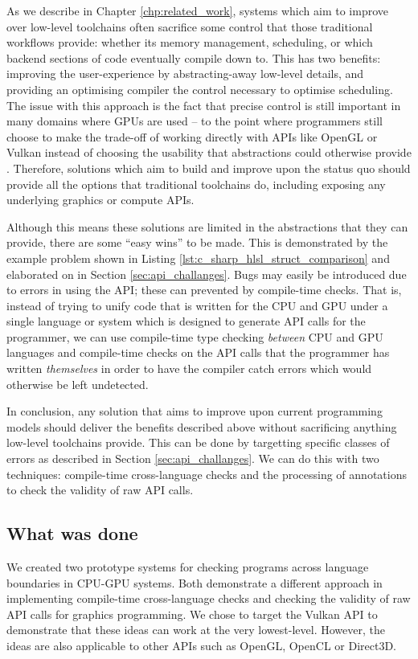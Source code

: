 \documentclass[a4paper,12pt,twoside,openright]{report}
\begin{document}
As we describe in Chapter \ref{chp:related_work}, systems which aim to improve
over low-level toolchains often sacrifice some control that those traditional
workflows provide: whether its memory management, scheduling, or which backend
sections of code eventually compile down to. This has two benefits: improving
the user-experience by abstracting-away low-level details, and providing an
optimising compiler the control necessary to optimise scheduling. The issue
with this approach is the fact that precise control is still important in many
domains where GPUs are used -- to the point where programmers still choose to
make the trade-off of working directly with APIs like OpenGL or Vulkan instead
of choosing the usability that abstractions could otherwise provide
\cite{TODO}. Therefore, solutions which aim to build and improve upon the
status quo should provide all the options that traditional toolchains do,
including exposing any underlying graphics or compute APIs.

Although this means these solutions are limited in the abstractions that they
can provide, there are some ``easy wins'' to be made. This is demonstrated by
the example problem shown in Listing \ref{lst:c_sharp_hlsl_struct_comparison}
and elaborated on in Section \ref{sec:api_challanges}. Bugs may easily be
introduced due to errors in using the API; these can prevented by compile-time
checks. That is, instead of trying to unify code that is written for the CPU
and GPU under a single language or system which is designed to generate API
calls for the programmer, we can use compile-time type checking
\textit{between} CPU and GPU languages and compile-time checks on the API calls
that the programmer has written \textit{themselves} in order to have the
compiler catch errors which would otherwise be left undetected.

In conclusion, any solution that aims to improve upon current programming
models should deliver the benefits described above without sacrificing anything
low-level toolchains provide. This can be done by targetting specific classes of
errors as described in Section \ref{sec:api_challanges}. We can do this with
two techniques: compile-time cross-language checks and the processing of
annotations to check the validity of raw API calls.

\subsection{What was done}

We created two prototype systems for checking programs across language
boundaries in CPU-GPU systems. Both demonstrate a different approach in
implementing compile-time cross-language checks and checking the validity of
raw API calls for graphics programming. We chose to target the Vulkan API to
demonstrate that these ideas can work at the very lowest-level. However, the
ideas are also applicable to other APIs such as OpenGL, OpenCL or Direct3D.
\end{document}
